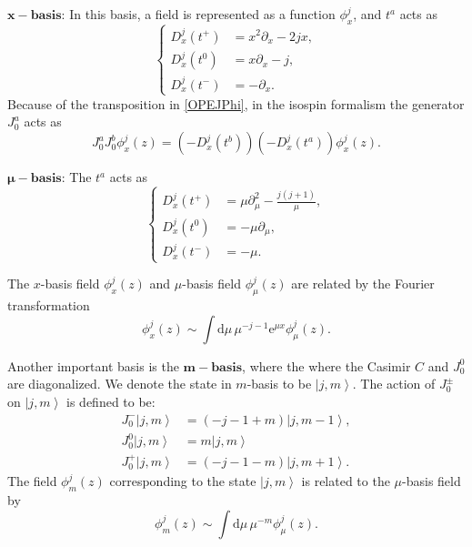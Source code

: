 \documentclass[10pt,a4paper]{article}
\numberwithin{equation}{section}
\newcommand{\ket}[1]{\left| #1 \right\rangle}
\begin{document}
$\mathbf{x-basis}$: In this basis, a field is represented as a function $\phi^{j}_{x}$, and $t^{a}$ acts as 
\begin{equation}
    \left\{
        \begin{aligned}
            D^{j}_{x}(t^{+}) &= x^{2} \partial_{x} - 2 j x, \\
            D^{j}_{x}(t^{0}) &= x \partial_{x} - j, \\
            D^{j}_{x}(t^{-}) &= - \partial_{x}.
        \end{aligned}
    \right. \label{Diffx}
\end{equation}
Because of the transposition in \ref{OPEJPhi}, in the isospin formalism the generator $J^{a}_{0}$ acts as 
\begin{equation}
    J^{a}_{0} J^{b}_{0} \phi^{j}_{x}(z) = \left( -D^{j}_{x}\left(t^{b}\right) \right) \left( -D^{j}_{x}\left(t^{a}\right) \right) \phi^{j}_{x}(z).
\end{equation}

$\mathbf{\mu-basis}$: The $t^{a}$ acts as 
\begin{equation}
    \left\{
        \begin{aligned}
            D^{j}_{x}(t^{+}) &= \mu \partial_{\mu}^{2} - \frac{j(j+1)}{\mu}, \\
            D^{j}_{x}(t^{0}) &= -\mu \partial_{\mu}, \\
            D^{j}_{x}(t^{-}) &= -\mu.
        \end{aligned}
    \right. \label{Diffmu}
\end{equation}

The $x$-basis field $\phi^{j}_{x}(z)$ and $\mu$-basis field $\phi^{j}_{\mu}(z)$ are related by the Fourier transformation 
\begin{equation}
    \phi^{j}_{x}(z) \sim \int \mathrm{d} \mu \, \mu^{-j-1} \mathrm{e}^{\mu x} \phi^{j}_{\mu}(z).
\end{equation}

Another important basis is the $\mathbf{m-basis}$, where the where the Casimir $C$ and $J^{0}_{0}$ are diagonalized. We denote the 
state in $m$-basis to be $\ket{j,m}$. The action of 
$J^{\pm}_{0}$ on $\ket{j,m}$ is defined to be:
\begin{equation}
    \begin{aligned}
        J^{-}_{0} \ket{j,m} &= (-j-1+m)\ket{j,m-1}, \\
        J^{0}_{0} \ket{j,m} &= m \ket{j,m} \\
        J^{+}_{0} \ket{j,m} &= (-j-1-m)\ket{j,m+1}. \label{Jpm}
    \end{aligned}
\end{equation}
The field $\phi^{j}_{m}(z)$ corresponding to the state $\ket{j,m}$ is related to the $\mu$-basis field by 
\begin{equation}
    \phi^{j}_{m}(z) \sim \int \mathrm{d} \mu \, \mu^{-m} \phi^{j}_{\mu}(z).
\end{equation}
\end{document}

